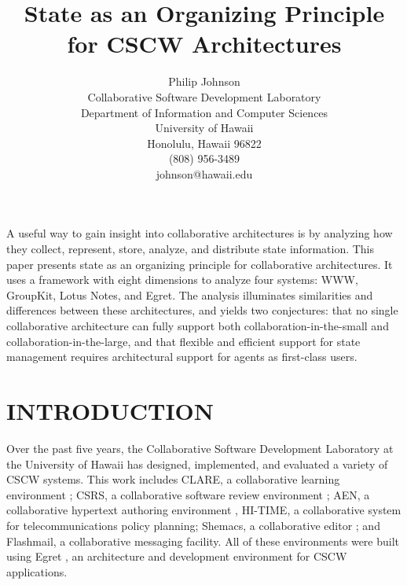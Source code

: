 




\title{State as an Organizing Principle for CSCW Architectures}

\author{
Philip Johnson\\
Collaborative Software Development Laboratory\\
Department of Information and Computer Sciences\\
University of Hawaii\\
Honolulu, Hawaii 96822\\
(808) 956-3489\\
johnson@hawaii.edu}

\maketitle

\abstract 

A useful way to gain insight into collaborative architectures is by
analyzing how they collect, represent, store, analyze, and distribute state
information.  This paper presents state as an organizing principle for
collaborative architectures. It uses a framework with eight dimensions to
analyze four systems: WWW, GroupKit, Lotus Notes, and Egret. The analysis
illuminates similarities and differences between these architectures, and
yields two conjectures: that no single collaborative architecture can fully
support both collaboration-in-the-small and collaboration-in-the-large, and
that flexible and efficient support for state management requires
architectural support for agents as first-class users.

\section{INTRODUCTION}

Over the past five years, the Collaborative Software Development Laboratory
at the University of Hawaii has designed, implemented, and evaluated a
variety of CSCW systems.  This work includes CLARE, a collaborative
learning environment \cite{csdl-93-21}; CSRS, a collaborative software
review environment \cite{csdl-92-07}; AEN, a collaborative hypertext
authoring environment \cite{csdl-94-20}, HI-TIME, a collaborative system
for telecommunications policy planning; Shemacs, a collaborative editor
\cite{csdl-95-16}; and Flashmail, a collaborative messaging facility.  All
of these environments were built using Egret \cite{csdl-92-01}, an architecture
and development environment for CSCW applications. 


